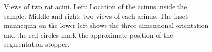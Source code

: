 \documentclass[a4paper,DIV=calc,abstract,english]{scrartcl}
\newlength\imagewidth		%
\newlength\imagescale		%
\begin{document}
\begin{figure}[htb]
{%
		}%
	\caption{Views of two rat  acini. Left: Location of the acinus inside the sample. Middle and right: two views of each acinus. The inset mannequin on the lower left shows the three-dimensional orientation and the red circles mark the approximate position of the segmentation stopper.}
	\label{fig:acini}
\end{figure}
\end{document}
